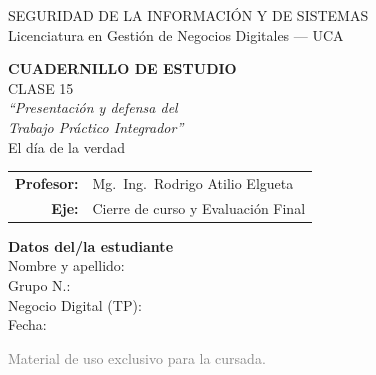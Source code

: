 \documentclass[12pt,a4paper]{article}
\begin{document}
\begin{titlepage}
\centering
\vspace*{1cm}

\begin{cajaTitulo}[width=\textwidth, halign=center]
  SEGURIDAD DE LA INFORMACI\'ON Y DE SISTEMAS\\[4pt]
  {\large Licenciatura en Gesti\'on de Negocios Digitales --- UCA}
\end{cajaTitulo}

\vspace{1.5cm}

{\Huge\bfseries\color{azulUCA} CUADERNILLO DE ESTUDIO}\\[8pt]
{\LARGE\color{doradoUCA} CLASE 15}\\[12pt]
{\Large\itshape ``Presentaci\'on y defensa del\\[2pt] Trabajo Pr\'actico Integrador''}\\[6pt]
{\large\color{doradoFinal}\; El d\'ia de la verdad}\\[1.5cm]

\begin{tabular}{rl}
\textbf{Profesor:}   & Mg.\ Ing.\ Rodrigo Atilio Elgueta \\[4pt]
\textbf{Eje:}        & Cierre de curso y Evaluaci\'on Final \\[4pt]
\end{tabular}

\vfill

\begin{tcolorbox}[colback=grisClaro, colframe=azulUCA, arc=3mm, width=0.9\textwidth]
  \centering
  {\bfseries Datos del/la estudiante}\\[10pt]
  Nombre y apellido: \underline{\hspace{5cm}}\\[10pt]
  Grupo N.\textdegree: \underline{\hspace{5cm}}\\[10pt]
  Negocio Digital (TP): \underline{\hspace{5cm}}\\[10pt]
  Fecha: \underline{\hspace{5cm}}
\end{tcolorbox}

\vspace{1cm}
{\small\textcolor{gray}{Material de uso exclusivo para la cursada.}}
\end{titlepage}
\end{document}
